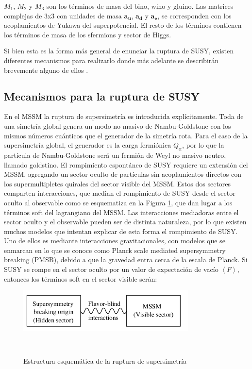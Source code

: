 $M_1$, $M_2$ y $M_3$ son los términos de masa del bino, wino y gluino. Las matrices complejas de 3x3 con unidades de masa $\textbf{a}_\textbf{u}$, $\textbf{a}_\textbf{d}$ y $\textbf{a}_\textbf{e}$, se corresponden con los acoplamientos de Yukawa del superpotencial. El resto de los términos contienen los términos de masa de los sfermions y sector de Higgs.

Si bien esta es la forma más general de enunciar la ruptura de SUSY, existen diferentes mecanismos para realizarlo donde más adelante se describirán brevemente alguno de ellos .

\subsection{Mecanismos para la ruptura de SUSY}


En el MSSM la ruptura de supersimetría es introducida explícitamente. Toda de una simetría global genera un modo no masivo de Nambu-Goldstone con los mismos números cuánticos que el generador de la simetría rota.
Para el caso de la supersimetría global, el generador es la carga fermiónica $Q_{\alpha}$,
por lo que la partícula de Nambu-Goldstone será un fermión de Weyl no masivo
neutro, llamado goldstino.
El rompimiento espontáneo de SUSY requiere un extensión del MSSM, agregando un sector oculto de partículas sin acoplamientos directos con los supermultipletes quirales del sector visible del
MSSM. Estos dos sectores comparten interacciones, que median el rompimiento de
SUSY desde el sector oculto al observable como se esquematiza en la Figura \ref{fig:hidden_sector}, que dan lugar a los términos soft del lagrangiano del MSSM.
Las interacciones mediadoras entre el sector oculto y el observable pueden ser
de distinta naturaleza, por lo que existen muchos modelos que intentan explicar de
esta forma el rompimiento de SUSY. Uno de ellos es mediante interacciones gravitacionales, con modelos que se enmarcan en lo que se conoce como Planck scale mediated supersymmetry breaking (PMSB), debido a que la gravedad entra cerca de la escala de Planck. Si SUSY se rompe en el sector oculto
por un valor de expectación de vacío $\left< F \right>$, entonces los términos soft en el sector visible serán:

\begin{figure}
  \centering
  \includegraphics[width=0.8\textwidth]{images/hidden_sector.png}
  \caption{Estructura esquemática de la ruptura de supersimetría}\
  \label{fig:hidden_sector}
\end{figure}

